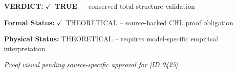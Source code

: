 \textbf{VERDICT:} \ensuremath{\checkmark}\ \textbf{TRUE} --- conserved total-structure validation

\textbf{Formal Status:} \ensuremath{\checkmark}\ THEORETICAL -- source-backed CHL proof obligation

\textbf{Physical Status:} THEORETICAL -- requires model-specific empirical interpretation
\par\vspace{0.45em}
\par
\vfill
\begingroup\footnotesize\itshape
Proof visual pending source-specific approval for [ID 0425].
\par\endgroup
\vfill
\endgroup
\endgroup
